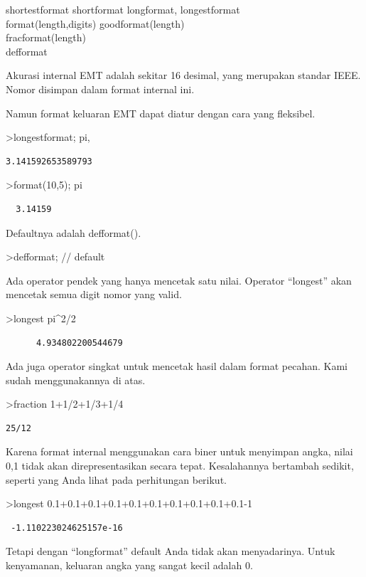 \documentclass[
]{book}
\begin{document}
shortestformat shortformat longformat, longestformat\\
format(length,digits) goodformat(length)\\
fracformat(length)\\
defformat

Akurasi internal EMT adalah sekitar 16 desimal, yang merupakan standar IEEE. Nomor disimpan dalam format internal ini.

Namun format keluaran EMT dapat diatur dengan cara yang fleksibel.

\textgreater longestformat; pi,

\begin{verbatim}
3.141592653589793
\end{verbatim}

\textgreater format(10,5); pi

\begin{verbatim}
  3.14159 
\end{verbatim}

Defaultnya adalah defformat().

\textgreater defformat; // default

Ada operator pendek yang hanya mencetak satu nilai. Operator ``longest'' akan mencetak semua digit nomor yang valid.

\textgreater longest pi\^{}2/2

\begin{verbatim}
      4.934802200544679 
\end{verbatim}

Ada juga operator singkat untuk mencetak hasil dalam format pecahan. Kami sudah menggunakannya di atas.

\textgreater fraction 1+1/2+1/3+1/4

\begin{verbatim}
25/12
\end{verbatim}

Karena format internal menggunakan cara biner untuk menyimpan angka, nilai 0,1 tidak akan direpresentasikan secara tepat. Kesalahannya bertambah sedikit, seperti yang Anda lihat pada perhitungan berikut.

\textgreater longest 0.1+0.1+0.1+0.1+0.1+0.1+0.1+0.1+0.1+0.1-1

\begin{verbatim}
 -1.110223024625157e-16 
\end{verbatim}

Tetapi dengan ``longformat'' default Anda tidak akan menyadarinya. Untuk kenyamanan, keluaran angka yang sangat kecil adalah 0.
\end{document}

